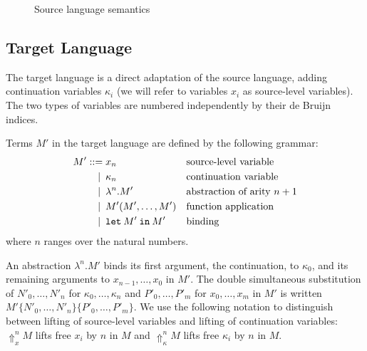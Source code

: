 \documentclass[a4paper,11pt,draft]{article}
\newcommand{\kw}[1]{\mathtt{#1}}
\begin{document}
\begin{figure}
\caption{Source language semantics}
\label{fig:sourcesemantics}
\end{figure}

\subsection{Target Language}

The target language is a direct adaptation of the source language, adding
continuation variables $\kappa_{i}$ (we will refer to variables $x_{i}$
as source-level variables). The two types of variables are numbered
independently by their de Bruijn indices.

Terms $M'$ in the target language are defined by the following grammar:
\begin{align*}
M' ::=            &\; x_{n}
                  && \text{source-level variable} \\
\llap{\textbar\:} &\; \kappa_{n}
                  && \text{continuation variable} \\
\llap{\textbar\:} &\; \lambda^{n}.M'
                  && \text{abstraction of arity $n+1$} \\
\llap{\textbar\:} &\; M'(M', \ldots, M')
                  && \text{function application} \\
\llap{\textbar\:} &\; \kw{let} \: M' \: \kw{in} \: M'
                  && \text{binding}
\end{align*}
where $n$ ranges over the natural numbers.

An abstraction $\lambda^{n}.M'$ binds its first argument, the continuation,
to $\kappa_{0}$, and its remaining arguments to $x_{n-1}, \ldots, x_{0}$ in
$M'$.
The double simultaneous substitution of $N'_{0}, \ldots, N'_{n}$ for
$\kappa_{0}, \ldots, \kappa_{n}$ and $P'_{0}, \ldots, P'_{m}$ for
$x_{0}, \ldots, x_{m}$ in $M'$ is written
$M'\{N'_{0}, \ldots, N'_{n}\}\{P'_{0}, \ldots, P'_{m}\}$.
We use the following notation to distinguish between lifting of
source-level variables and lifting of continuation variables:
$\Uparrow_{x}^{n} M$ lifts free $x_{i}$ by $n$ in $M$ and
$\Uparrow_{\kappa}^{n} M$ lifts free $\kappa_{i}$ by $n$ in $M$.
\end{document}
